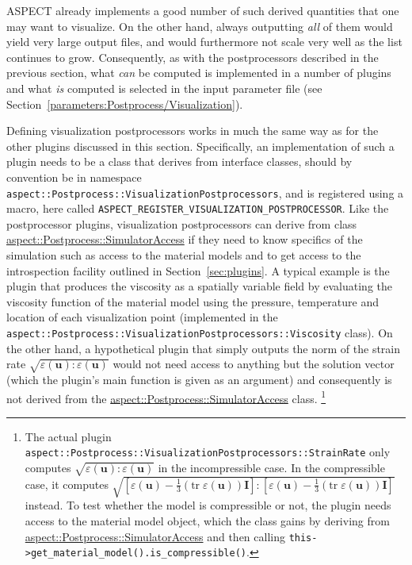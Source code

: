 \documentclass{article}
\newcommand{\aspect}{\textsc{ASPECT}}
\begin{document}
\aspect{} already implements a good number of such derived quantities that one
may want to visualize. On the other hand, always outputting \textit{all} of
them would yield very large output files, and would furthermore not scale very
well as the list continues to grow. Consequently, as with the postprocessors
described in the previous section, what \textit{can} be computed is
implemented in a number of plugins and what \textit{is} computed is selected
in the input parameter file (see
Section~\ref{parameters:Postprocess/Visualization}).

Defining visualization postprocessors works in much the same way as for the
other plugins discussed in this section. Specifically, an implementation of
such a plugin needs to be a class that derives from interface classes,
should by convention be in namespace
\texttt{aspect::Postprocess::VisualizationPostprocessors},
and is registered using a macro, here called
\texttt{ASPECT\_REGISTER\_VISUALIZATION\_POSTPROCESSOR}. Like the
postprocessor plugins, visualization postprocessors can derive from class
\href{doc/doxygen/classaspect_1_1Postprocess_1_1SimulatorAccess.html}{aspect::Postprocess::SimulatorAccess} if they need to know specifics
of the simulation such as access to the material models and to get
access to the introspection facility outlined in Section~\ref{sec:plugins}. A typical example is
the plugin that produces the viscosity as a spatially variable field by
evaluating the viscosity function of the material model using the pressure,
temperature and location of each visualization point (implemented in the
\texttt{aspect::Postprocess::VisualizationPostprocessors::Viscosity}
class). On the other hand, a hypothetical plugin
that
simply outputs the norm of the strain rate $\sqrt{\varepsilon(\mathbf
  u):\varepsilon(\mathbf u)}$ would not need access to anything but the
solution vector (which the plugin's main function is given as an argument)
and consequently is not derived from the
\href{doc/doxygen/classaspect_1_1Postprocess_1_1SimulatorAccess.html}{aspect::Postprocess::SimulatorAccess}
class.%
\footnote{The actual plugin
  \texttt{aspect::Postprocess::VisualizationPostprocessors::StrainRate}
  only computes $\sqrt{\varepsilon(\mathbf
    u):\varepsilon(\mathbf u)}$ in the incompressible case. In the compressible
  case, it computes
  $\sqrt{[\varepsilon(\mathbf u)-\tfrac 13(\textrm{tr}\;\varepsilon(\mathbf
    u))\mathbf I]:[\varepsilon(\mathbf u)-\tfrac
    13(\textrm{tr}\;\varepsilon(\mathbf u))\mathbf I]}$ instead. To test whether
  the model is compressible or not, the plugin needs access to the material
  model object, which the class gains by deriving from
  \href{doc/doxygen/classaspect_1_1Postprocess_1_1SimulatorAccess.html}{aspect::Postprocess::SimulatorAccess}
  and then calling \texttt{this->get\_material\_model().is\_compressible()}.}
\end{document}
